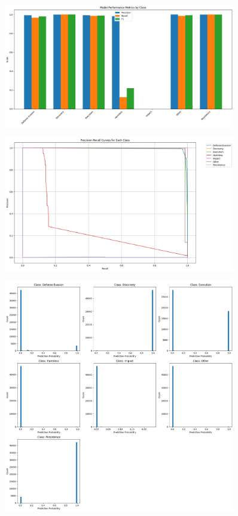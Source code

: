     \begin{figure}[H]
        \centering
        \includegraphics[width=0.9\textwidth]{../figures/plots/section4/performance_metrics.png}
        \caption{}
        \label{fig:}
    \end{figure}
    
    \begin{figure}[H]
        \centering
        \includegraphics[width=0.9\textwidth]{../figures/plots/section4/precision_recall_curves.png}
        \caption{}
        \label{fig:}
    \end{figure}
    
    \begin{figure}[H]
        \centering
        \includegraphics[width=0.9\textwidth]{../figures/plots/section4/probability_histograms.png}
        \caption{}
        \label{fig:}
    \end{figure}
    